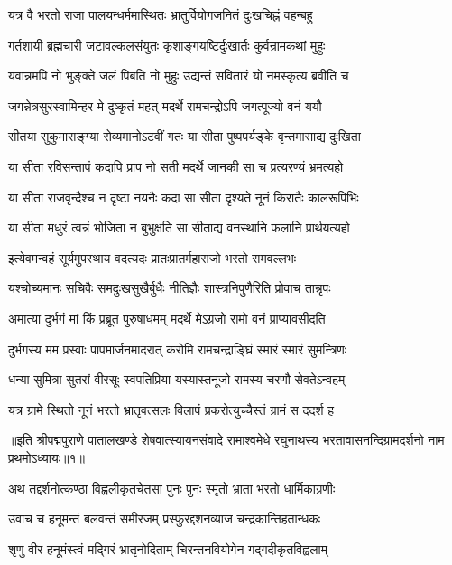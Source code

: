 \twolineshloka
{यत्र वै भरतो राजा पालयन्धर्ममास्थितः}
{भ्रातुर्वियोगजनितं दुःखचिह्नं वहन्बहु}%

\twolineshloka
{गर्तशायी ब्रह्मचारी जटावल्कलसंयुतः}
{कृशाङ्गयष्टिर्दुःखार्तः कुर्वन्रामकथां मुहुः}%

\twolineshloka
{यवान्नमपि नो भुङ्क्ते जलं पिबति नो मुहुः}
{उद्यन्तं सवितारं यो नमस्कृत्य ब्रवीति च}%

\twolineshloka
{जगन्नेत्रसुरस्वामिन्हर मे दुष्कृतं महत्}
{मदर्थे रामचन्द्रोऽपि जगत्पूज्यो वनं ययौ}%

\twolineshloka
{सीतया सुकुमाराङ्ग्या सेव्यमानोऽटवीं गतः}
{या सीता पुष्पपर्यङ्के वृन्तमासाद्य दुःखिता}%

\twolineshloka
{या सीता रविसन्तापं कदापि प्राप नो सती}
{मदर्थे जानकी सा च प्रत्यरण्यं भ्रमत्यहो}%

\twolineshloka
{या सीता राजवृन्दैश्च न दृष्टा नयनैः कदा}
{सा सीता दृश्यते नूनं किरातैः कालरूपिभिः}%

\twolineshloka
{या सीता मधुरं त्वन्नं भोजिता न बुभुक्षति}
{सा सीताद्य वनस्थानि फलानि प्रार्थयत्यहो}%

\twolineshloka
{इत्येवमन्वहं सूर्यमुपस्थाय वदत्यदः}
{प्रातःप्रातर्महाराजो भरतो रामवल्लभः}%

\twolineshloka
{यश्चोच्यमानः सचिवैः समदुःखसुखैर्बुधैः}
{नीतिज्ञैः शास्त्रनिपुणैरिति प्रोवाच तान्नृपः}%

\twolineshloka
{अमात्या दुर्भगं मां किं प्रब्रूत पुरुषाधमम्}
{मदर्थे मेऽग्रजो रामो वनं प्राप्यावसीदति}%

\twolineshloka
{दुर्भगस्य मम प्रस्वाः पापमार्जनमादरात्}
{करोमि रामचन्द्राङ्घ्रिं स्मारं स्मारं सुमन्त्रिणः}%

\twolineshloka
{धन्या सुमित्रा सुतरां वीरसूः स्वपतिप्रिया}
{यस्यास्तनूजो रामस्य चरणौ सेवतेऽन्वहम्}%

\twolineshloka
{यत्र ग्रामे स्थितो नूनं भरतो भ्रातृवत्सलः}
{विलापं प्रकरोत्युच्चैस्तं ग्रामं स ददर्श ह}%

{॥इति श्रीपद्मपुराणे पातालखण्डे शेषवात्स्यायनसंवादे रामाश्वमेधे रघुनाथस्य भरतावासनन्दिग्रामदर्शनो नाम प्रथमोऽध्यायः॥१॥}



\twolineshloka
{अथ तद्दर्शनोत्कण्ठा विह्वलीकृतचेतसा}
{पुनः पुनः स्मृतो भ्राता भरतो धार्मिकाग्रणीः}%

\twolineshloka
{उवाच च हनूमन्तं बलवन्तं समीरजम्}
{प्रस्फुरद्दशनव्याज चन्द्रकान्तिहतान्धकः}%

\twolineshloka
{शृणु वीर हनूमंस्त्वं मद्गिरं भ्रातृनोदिताम्}
{चिरन्तनवियोगेन गद्गदीकृतविह्वलाम्}%

